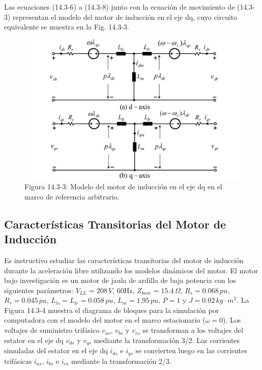 \documentclass[letterpaper,12pt]{article}
\begin{document}
Las ecuaciones (14.3-6) a (14.3-8) junto con la ecuación de movimiento de (14.3-3) representan el modelo del motor de inducción en el eje dq, cuyo circuito equivalente se muestra en la Fig. 14.3-3.

\begin{figure}[ht]
\centering
\includegraphics{graficos/img05.jpg}
\caption{Figura 14.3-3: Modelo del motor de inducción en el eje dq en el marco de referencia arbitrario.}
\end{figure}
\FloatBarrier

\subsection{Características Transitorias del Motor de Inducción}

Es instructivo estudiar las características transitorias del motor de inducción durante la aceleración libre utilizando los modelos dinámicos del motor. El motor bajo investigación es un motor de jaula de ardilla de baja potencia con los siguientes parámetros: $V_{LL} = 208 \, V$, 60Hz, $Z_{base} = 15.4 \, \Omega$, $R_s = 0.068 \, pu$, $R_r = 0.045 \, pu$, $L_{ls} = L_{lr} = 0.058 \, pu$, $L_m = 1.95 \, pu$, $P = 1$ y $J = 0.02 \, kg\cdot m^2$. La Figura 14.3-4 muestra el diagrama de bloques para la simulación por computadora con el modelo del motor en el marco estacionario ($\omega = 0$). Los voltajes de suministro trifásico $v_{as}$, $v_{bs}$ y $v_{cs}$ se transforman a los voltajes del estator en el eje dq $v_{ds}$ y $v_{qs}$ mediante la transformación 3/2. Las corrientes simuladas del estator en el eje dq $i_{ds}$ e $i_{qs}$ se convierten luego en las corrientes trifásicas $i_{as}$, $i_{bs}$ e $i_{cs}$ mediante la transformación 2/3.
\end{document}

